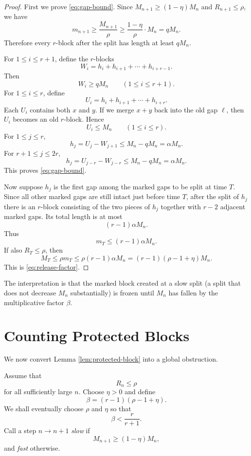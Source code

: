\documentclass[11pt]{article}
\theoremstyle{remark}
\begin{document}
\smallskip
\begin{proof}
First we prove \eqref{eq:gap-bound}. Since $M_{n+1}\geq (1-\eta)M_n$ and $R_{n+1}\leq\rho$, we have
\[
    m_{n+1}
    \geq
    \frac{M_{n+1}}{\rho}
    \geq
    \frac{1-\eta}{\rho}\cdot M_n
    =
    qM_n .
\]
Therefore every $r$-block after the split has length at least $qM_n$.

\bigskip
\noindent
For $1\leq i\leq r+1$, define the $r$-blocks
\[
    W_i=h_i+h_{i+1}+\cdots+h_{i+r-1}.
\]
Then
\[
    W_i\geq qM_n
    \qquad (1\leq i\leq r+1).       \tag{3.3}\label{eq:W-lower}
\]
For $1\leq i\leq r$, define
\[
    U_i=h_i+h_{i+1}+\cdots+h_{i+r}.
\]
Each $U_i$ contains both $x$ and $y$. If we merge $x+y$ back into the old gap $\ell$, then $U_i$ becomes an old $r$-block. Hence
\[
    U_i\leq M_n
    \qquad (1\leq i\leq r).         \tag{3.4}\label{eq:U-upper}
\]
For $1\leq j\leq r$,
\[
    h_j=U_j-W_{j+1}\leq M_n-qM_n=\alpha M_n.
\]
For $r+1\leq j\leq 2r$,
\[
    h_j=U_{j-r}-W_{j-r}\leq M_n-qM_n=\alpha M_n.
\]
This proves \eqref{eq:gap-bound}.

\bigskip
\noindent
Now suppose $h_j$ is the first gap among the marked gaps to be split at time $T$. Since all other marked gaps are still intact just before time $T$, after the split of $h_j$ there is an $r$-block consisting of the two pieces of $h_j$ together with $r-2$ adjacent marked gaps. Its total length is at most
\[
    (r-1)\alpha M_n.
\]
Thus
\[
    m_T\leq (r-1)\alpha M_n.
\]
If also $R_T\leq\rho$, then
\[
    M_T\leq \rho m_T
    \leq
    \rho(r-1)\alpha M_n
    =
    (r-1)(\rho-1+\eta)M_n.
\]
This is \eqref{eq:release-factor}.
\end{proof}

\smallskip
\noindent
The interpretation is that the marked block created at a slow split (a split that does not decrease $M_n$ substantially) is frozen until $M_n$ has fallen by the multiplicative factor $\beta$.

\section{Counting Protected Blocks}

We now convert Lemma \ref{lem:protected-block} into a global obstruction.

\bigskip
\noindent
Assume that
\[
    R_n\leq \rho
\]
for all sufficiently large $n$. Choose $\eta>0$ and define
\[
    \beta=(r-1)(\rho-1+\eta).
\]
We shall eventually choose $\rho$ and $\eta$ so that
\[
    \beta<\frac{r}{r+1}.          \tag{4.1}\label{eq:beta-small}
\]
Call a step $n\to n+1$ \emph{slow} if
\[
    M_{n+1}\geq (1-\eta)M_n,
\]
and \emph{fast} otherwise.
\end{document}
